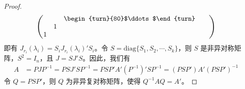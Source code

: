 \documentclass[../../main.tex]{subfiles}%
\begin{document}
\begin{proof}
\begin{align*}
\begin{pmatrix}
& & \begin{turn}{80}$\ddots$\end{turn} & & \\
& 1 & & & \\
1 & & & &
\end{pmatrix}
\end{align*}
即有 $J_{r_i}(\lambda_i) = S_iJ_{r_i}(\lambda_i)'S_i$。令 $S = \mathrm{diag}\{S_1,S_2,\cdots,S_k\}$，则 $S$ 是非异对称矩阵，$S^2 = I_n$，且 $J = SJ'S$。因此，我们有
\begin{align*}
A &= PJP^{-1} = PSJ'SP^{-1} = PSP'A'(P^{-1})'SP^{-1} = (PSP')A'(PSP')^{-1}
\end{align*}
令 $Q = PSP'$，则 $Q$ 为非异复对称矩阵，使得 $Q^{-1}AQ = A'$。

\end{proof}
\end{document}
